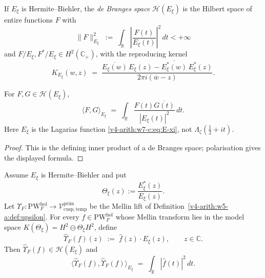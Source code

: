 \begin{definition}
\label{v4-arith:w7-c:def:H-E-xi}
If \(E_{\xi}\) is Hermite--Biehler, the
\emph{de Branges space}
\(\mathcal{H}(E_{\xi})\) is the Hilbert space of entire functions \(F\)
with
\begin{equation}
\label{v4-arith:w7-c:eq:dB-norm}
\|F\|_{E_{\xi}}^{2}\;:=\;\int_{\mathbb{R}}\left|\frac{F(t)}{E_{\xi}(t)}\right|^{2}\,dt<+\infty
\end{equation}
and \(F/E_{\xi},F^{*}/E_{\xi}\in H^{2}(\mathbb{C}_{+})\), with the
reproducing kernel
\begin{equation}
\label{v4-arith:w7-c:eq:dB-kernel-explicit}
K_{E_{\xi}}(w,z)\;=\;\frac{\overline{E_{\xi}(w)}\,E_{\xi}(z)-\overline{E_{\xi}^{*}(w)}\,E_{\xi}^{*}(z)}{2\pi i(\overline{w}-z)}.
\end{equation}
\end{definition}

\begin{proposition}
\label{v4-arith:w7-c:prop:real-line-inner}
For \(F,G\in\mathcal{H}(E_{\xi})\),
\begin{equation}
\label{v4-arith:w7-c:eq:dB-inner}
\langle F,G\rangle_{E_{\xi}}\;=\;\int_{\mathbb{R}}\frac{F(t)\overline{G(t)}}{|E_{\xi}(t)|^{2}}\,dt.
\end{equation}
Here \(E_{\xi}\) is the Lagarias function
\eqref{v4-arith:w7-c:eq:E-xi}, not
\(\Lambda_{\zeta}(\tfrac12+it)\).
\end{proposition}

\begin{proof}
This is the defining inner product of a de Branges space; polarisation
gives the displayed formula.
\end{proof}

\begin{theorem}
\label{v4-arith:w7-c:thm:Mellin-dB-isometry}
Assume \(E_{\xi}\) is Hermite--Biehler and put
\[
\Theta_{\xi}(z):=\frac{E_{\xi}^{*}(z)}{E_{\xi}(z)}.
\]
Let
\(\Upsilon_{F}\colon\mathrm{PW}^{\mathrm{hol}}_{F}\to\mathcal{V}^{\mathrm{prim}}_{\mathrm{cusp,temp}}\)
be the Mellin lift of Definition~\ref{v4-arith:w5-a:def:upsilon}. For every
\(f\in\mathrm{PW}^{\mathrm{hol}}_{F}\) whose Mellin transform lies in
the model space \(K(\Theta_{\xi})=H^{2}\ominus\Theta_{\xi}H^{2}\),
define
\begin{equation}
\label{v4-arith:w7-c:eq:dB-lift}
\widehat{\Upsilon}_{F}(f)(z)\;:=\;\widehat{f}(z)\cdot E_{\xi}(z),
\qquad z\in\mathbb{C}.
\end{equation}
Then \(\widehat{\Upsilon}_{F}(f)\in\mathcal H(E_{\xi})\) and
\begin{equation}
\label{v4-arith:w7-c:eq:isometry}
\langle\widehat{\Upsilon}_{F}(f),\widehat{\Upsilon}_{F}(f)\rangle_{E_{\xi}}
\;=\;\int_{\mathbb{R}}|\widehat{f}(t)|^{2}\,dt.
\end{equation}
\end{theorem}

